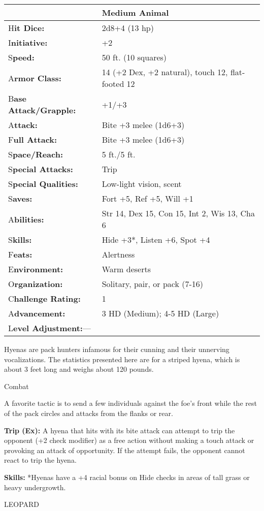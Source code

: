 \documentclass{article}
\begin{document}
\begin{tabular}{|>{\raggedright}p{91pt}|>{\raggedright}p{193pt}|}
\hline
  & Medium Animal\tabularnewline
\hline
H\textbf{it Dice:} & 2d8+4 (13 hp)\tabularnewline
\hline
I\textbf{nitiative:} & +2\tabularnewline
\hline
S\textbf{peed:} & 50 ft. (10 squares)\tabularnewline
\hline
A\textbf{rmor Class:} & 14 (+2 Dex, +2 natural), touch 12, flat-footed 12\tabularnewline
\hline
B\textbf{ase Attack/Grapple:} & +1/+3\tabularnewline
\hline
A\textbf{ttack:} & Bite +3 melee (1d6+3)\tabularnewline
\hline
F\textbf{ull Attack:} & Bite +3 melee (1d6+3)\tabularnewline
\hline
S\textbf{pace/Reach:} & 5 ft./5 ft.\tabularnewline
\hline
S\textbf{pecial Attacks:} & Trip\tabularnewline
\hline
S\textbf{pecial Qualities:} & Low-light vision, scent\tabularnewline
\hline
S\textbf{aves:} & Fort +5, Ref +5, Will +1\tabularnewline
\hline
A\textbf{bilities:} & Str 14, Dex 15, Con 15, Int 2, Wis 13, Cha 6\tabularnewline
\hline
S\textbf{kills:} & Hide +3*, Listen +6, Spot +4\tabularnewline
\hline
F\textbf{eats:} & Alertness\tabularnewline
\hline
E\textbf{nvironment:} & Warm deserts\tabularnewline
\hline
O\textbf{rganization:} & Solitary, pair, or pack (7-16)\tabularnewline
\hline
C\textbf{hallenge Rating:} & 1\tabularnewline
\hline
A\textbf{dvancement:} & 3 HD (Medium); 4-5 HD (Large)\tabularnewline
\hline
L\textbf{evel Adjustment:}--- & \tabularnewline
\hline
\end{tabular}

Hyenas are pack hunters infamous for their cunning and their unnerving vocalizations. 
The statistics presented here are for a striped hyena, which is about 3 feet long 
and weighs about 120 pounds.

Combat

A favorite tactic is to send a few individuals against the foe's front while the 
rest of the pack circles and attacks from the flanks or rear.

\textbf{Trip (Ex): }A hyena that hits with its bite attack can attempt to trip 
the opponent (+2 check modifier) as a free action without making a touch attack 
or provoking an attack of opportunity. If the attempt fails, the opponent cannot 
react to trip the hyena. 

\textbf{Skills:} *Hyenas have a +4 racial bonus on Hide checks in areas of tall 
grass or heavy undergrowth.

\vspace{12pt}
LEOPARD
\end{document}

